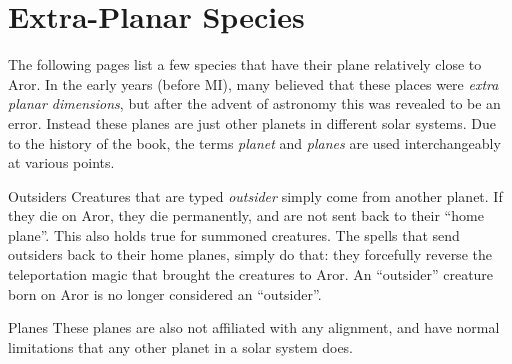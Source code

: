 

\section{Extra-Planar Species}
\label{sec:ExtraPlanar Species}

The following pages list a few species that have their plane relatively close
to Aror. In the early years (before MI), many believed that these places were
\emph{extra planar dimensions}, but after the advent of astronomy this was
revealed to be an error. Instead these planes are just other planets in
different solar systems. Due to the history of the book, the terms
\emph{planet} and \emph{planes} are used interchangeably at various points.

\begin{35e}{Outsiders}
  Creatures that are typed \emph{outsider} simply come from another planet. If
  they die on Aror, they die permanently, and are not sent back to their
  ``home plane''. This also holds true for summoned creatures. The spells that
  send outsiders back to their home planes, simply do that: they forcefully
  reverse the teleportation magic that brought the creatures to Aror. An
  ``outsider'' creature born on Aror is no longer considered an ``outsider''.
\end{35e}

\begin{35e}{Planes}
  These planes are also not affiliated with any alignment, and have normal
  limitations that any other planet in a solar system does.
\end{35e}






